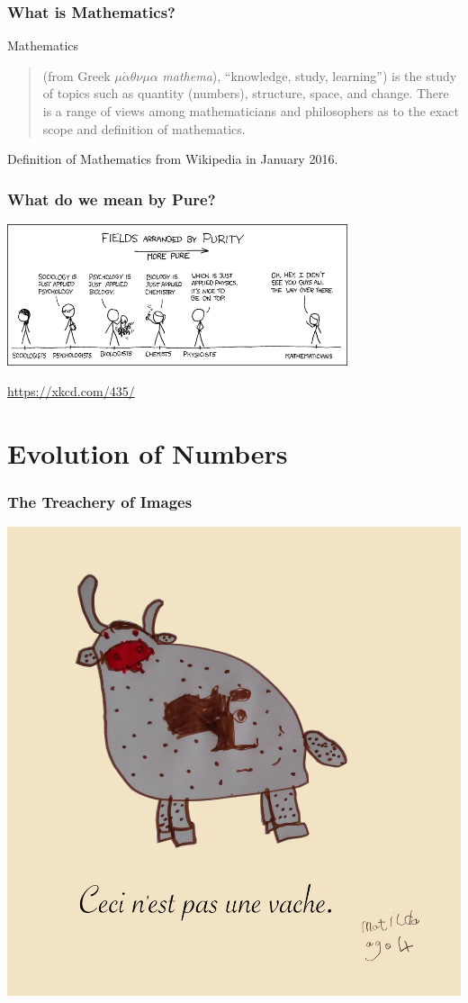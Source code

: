 \documentclass{beamer}
\begin{document}
\begin{frame}
  \frametitle{What is Mathematics?}
  
  \begin{block}{Mathematics}
  \begin{quote}
  (from Greek $\mu \acute{\alpha} \theta \nu \mu \alpha$ \emph{mathema}), ``knowledge, study, learning'') is the study of topics such as quantity (numbers), structure, space, and change. There is a range of views among mathematicians and philosophers as to the exact scope and definition of mathematics.
  \end{quote}
  \end{block}
  \hfill Definition of Mathematics from Wikipedia in January 2016.
\end{frame}


\begin{frame}
  \frametitle{What do we mean by Pure?}

\begin{center}
\includegraphics[width = 10cm]{png/purity.png}
\end{center}
\hfill \url{https://xkcd.com/435/}
\end{frame}


\section{Evolution of Numbers}


\begin{frame}
  \frametitle{The Treachery of Images}
  
  \begin{center}
  \includegraphics[width=6 cm]{png/inaugural-caption-cow.png}
  \end{center}
\end{frame}
\end{document}
